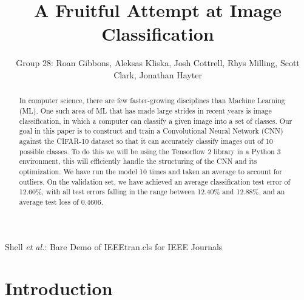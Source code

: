 \documentclass[journal]{IEEEtran}
\begin{document}
%
\title{ A Fruitful Attempt at Image Classification \\ }


\author{Group 28: Roan Gibbons, Aleksas Kliska, Josh Cottrell, Rhys Milling, Scott Clark, Jonathan Hayter}




%
{Shell \MakeLowercase{\textit{et al.}}: Bare Demo of IEEEtran.cls for IEEE Journals}




\maketitle

\begin{abstract}
In computer science, there are few faster-growing disciplines than Machine Learning (ML). One such area of ML that has made large strides in recent years is image classification, in which a computer can classify a given image into a set of classes. Our goal in this paper is to construct and train a Convolutional Neural Network (CNN) against the CIFAR-10 dataset so that it can accurately classify images out of 10 possible classes. To do this we will be using the Tensorflow 2 library in a Python 3 environment, this will efficiently handle the structuring of the CNN and its optimization. We have run the model 10 times and taken an average to account for outliers. On the validation set, we have achieved an average classification test error of 12.60\%, with all test errors falling in the range between 12.40\% and 12.88\%, and an average test loss of 0.4606.\end{abstract}


\IEEEpeerreviewmaketitle

\section{Introduction}
\end{document}
